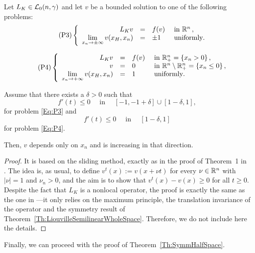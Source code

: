 \begin{proposition}
\label{Prop:HalfSpaceLimUnif}
Let $L_K \in \mathcal{L}_0(n,\gamma)$ and let $v$ be a bounded solution to one of the following problems:
\begin{equation}
\leqnomode
\tag{P3}
\label{Eq:P3}
\beqc{\PDEsystem}
L_K  v &=& f(v)  &\textrm{ in }\R^n\,,\\
\ds \lim_{x_n \to \pm \infty} v(x_H,x_n) &=& \pm 1 \,\,\, &\textrm{ uniformly}.
\eeqc
\end{equation}

\begin{equation}
\leqnomode
\tag{P4}
\label{Eq:P4}
\beqc{\PDEsystem}
L_K  v &=& f(v)  &\textrm{ in }\R^n_+ = \{ x_n>0\} \,,\\
v &=& 0  &\textrm{ in } \R^n \setminus \R^n_+ = \{ x_n\leq 0\}\,,\\
\ds \lim_{x_n \to + \infty} v(x_H,x_n) &=& 1 \,\,\, &\textrm{ uniformly}.
\eeqc
\end{equation}

\reqnomode

Assume that there exists a $\delta > 0$ such that
$$ f'(t) \leq 0 \quad \text{ in } \quad [-1,-1+\delta]\cup[1-\delta,1], $$
for problem \eqref{Eq:P3} and
$$ f'(t) \leq 0 \quad \text{ in } \quad [1-\delta,1] $$
for problem \eqref{Eq:P4}.

Then, $v$ depends only on $x_n$ and is increasing in that direction.
\end{proposition}

\begin{proof}
It is based on the sliding method, exactly as in the proof of Theorem~1 in \cite{BerestyckiHamelMonneau}. The idea is, as usual,   to define $ v^t(x) := v(x+\nu t) $ for every $\nu\in\mathbb{R}^n$ with $|\nu|=1$ and $\nu_n>0$, and the aim is to show that $v^t(x)-v(x)\geq 0$ for all $t\geq 0$. Despite the fact that $L_K$ is a nonlocal operator, the proof is exactly the same as the one in \cite{BerestyckiHamelMonneau} ---it only relies on the maximum principle, the translation invariance of the operator and the symmetry result of Theorem~\ref{Th:LiouvilleSemilinearWholeSpace}. Therefore, we do not include here the details.
\end{proof}






Finally, we can proceed with the proof of Theorem~\ref{Th:SymmHalfSpace}.

